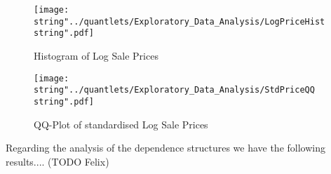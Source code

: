 \begin{figure}
  \centering
\texttt{[image: \\string"../quantlets/Exploratory\_Data\_Analysis/LogPriceHist\\string".pdf]}
  \caption{Histogram of Log Sale Prices}\label{fig:logpricehist}
\end{figure}

\begin{figure}
  \centering
\texttt{[image: \\string"../quantlets/Exploratory\_Data\_Analysis/StdPriceQQ\\string".pdf]}
  \caption{QQ-Plot of standardised Log Sale Prices}\label{fig:stdpriceqq}
\end{figure}






Regarding the analysis of the dependence structures we have the following results....
(TODO Felix)